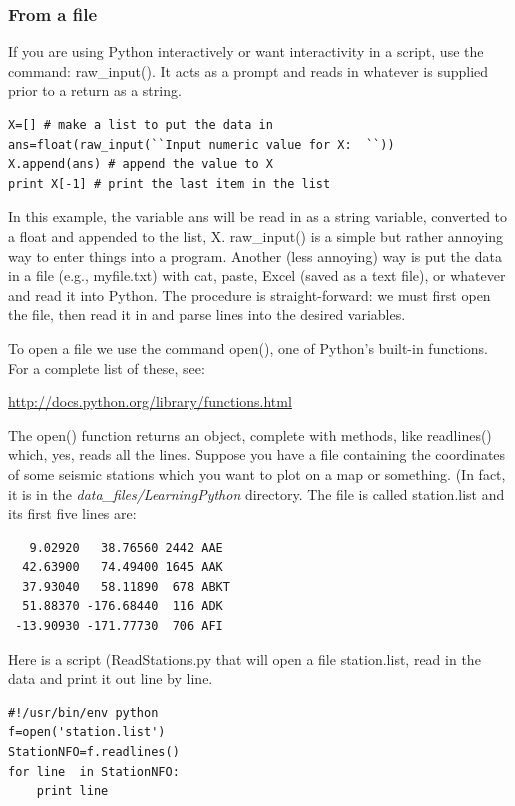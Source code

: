 \documentclass[11pt]{book}
\begin{document}
{{\subsubsection{From a file}

If you are using Python interactively or want interactivity in a script,  use the command:  {\color{blue}raw\_input()}.  It acts as a prompt and reads in whatever is supplied prior to a return as a string.

{ \color{blue} \begin{verbatim}
X=[] # make a list to put the data in
ans=float(raw_input(``Input numeric value for X:  ``))
X.append(ans) # append the value to X
print X[-1] # print the last item in the list
\end{verbatim}}
\noindent
In this example, the variable {\color{blue}ans} will be read in as a string variable,  converted to a float and appended to the list, {\color{blue}X}.    {\color{blue}raw\_input()} is a simple but rather annoying way to enter things into a program.
Another (less annoying)  way is  put the data in a file (e.g., myfile.txt) with cat, paste, Excel (saved as a text file), or whatever and read  it into Python.  The procedure is straight-forward: we must first open the file, then read it in and parse lines into the desired variables.

To open a file we use the command {\color{blue}open()}, one of Python's built-in functions.  For a complete list of these, see:

\url{http://docs.python.org/library/functions.html}

\noindent  The  {\color{blue}open()} function returns an object,  complete with methods, like {\color{blue}readlines()} which, yes, reads all the lines.   Suppose you have a file containing the coordinates of some
seismic stations which you want to plot on a map or something. (In fact, it is in the {\it data\_files/LearningPython} directory.   The file
is called {\color{blue}   station.list} and its first five lines are:

{\color{blue}\begin{verbatim}
   9.02920   38.76560 2442 AAE
  42.63900   74.49400 1645 AAK
  37.93040   58.11890  678 ABKT
  51.88370 -176.68440  116 ADK
 -13.90930 -171.77730  706 AFI
 \end{verbatim}}
Here is a script ({\color{blue}ReadStations.py} that will open a file  {\color{blue}station.list}, read in the data and print it out line by line.
{ \color{blue} \begin{verbatim}
#!/usr/bin/env python
f=open('station.list')
StationNFO=f.readlines()
for line  in StationNFO:
    print line
\end{verbatim}}

}}
\end{document}
